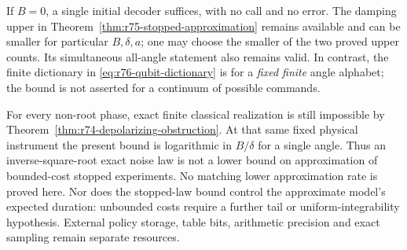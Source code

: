 If $B=0$, a single initial decoder suffices, with no call and no error.
The damping upper in Theorem~\ref{thm:r75-stopped-approximation} remains
available and can be smaller for particular $B,\delta,a$; one may choose
the smaller of the two proved upper counts.  Its simultaneous
all-angle statement also remains valid.  In contrast, the finite dictionary
in \eqref{eq:r76-qubit-dictionary} is for a \emph{fixed finite} angle
alphabet; the bound is not asserted for a continuum of possible commands.

For every non-root phase, exact finite classical realization is still
impossible by Theorem~\ref{thm:r74-depolarizing-obstruction}.  At that same
fixed physical instrument the present bound is logarithmic in $B/\delta$
for a single angle.  Thus an inverse-square-root exact noise law is not a
lower bound on approximation of bounded-cost stopped experiments.  No
matching lower approximation rate is proved here.  Nor does the stopped-law
bound control the approximate model's expected duration: unbounded costs
require a further tail or uniform-integrability hypothesis.  External
policy storage, table bits, arithmetic precision and exact sampling remain
separate resources.
